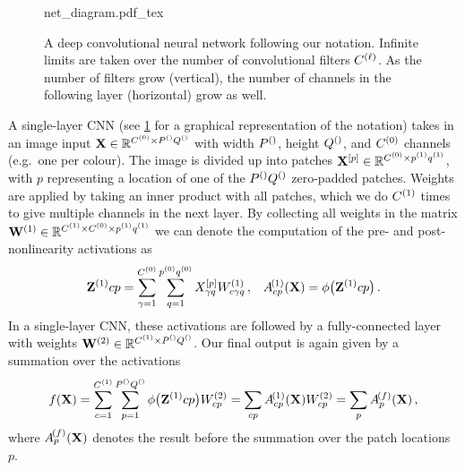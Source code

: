 \documentclass[tablecaption=bottom,wcp,nonatbib]{jmlr} %
\newcommand{\vX}{\mathbf{X}}
\newcommand{\vZ}{\mathbf{Z}}
\begin{document}
\begin{figure}[b]
  \centering
{\renewcommand{\layerAs}[1]{\vZ^{(#1)}}
  {net_diagram.pdf_tex}}
  \caption{A deep convolutional neural network following our notation. Infinite limits are taken over the number of convolutional filters $C^{(\ell)}$. As the number of filters grow (vertical), the number of channels in the following layer (horizontal) grow as well.}
  \label{fig:fancy-cnn}
\end{figure}

\newcommand{\convpatch}[2]{{#1}^{[#2]}}
A single-layer CNN (see \cref{fig:fancy-cnn} for a graphical representation of the notation) takes in an image input $\vX \in \Reals^{\layerC{0}\times \layersize{}}$ with width $P^{()}$, height $Q^{()}$, and $C^{(0)}$ channels (e.g.~one per colour). The image is divided up into patches $\convpatch{\vX}{p} \in \Reals^{\layerC{0}\times\patchw{1}\patchh{1}}$, with $p$ representing a location of one of the $P^{()}Q^{()}$ zero-padded patches. Weights are applied by taking an inner product with all patches, which we do $C^{(1)}$ times to give multiple channels in the next layer. By collecting all weights in the matrix $\mathbf{W}^{(1)}\in\mathbb{R}^{C^{(1)}\times C^{(0)}\times p^{(1)}q^{(1)}}$ we can denote the computation of the pre- and post-nonlinearity activations as
\begin{align}
    \layerAs{1}{cp} = \sum_{\gamma=1}^{\layerC0}\sum_{q=1}^{\patchw0\patchh0} \convpatch{X}{p}_{\gamma q} \layerWs1_{c\gamma q} \,, && \layerNLAs{(1)}{cp} = \phi\big(\layerAs{1}{cp}\big)\,.
\end{align}
In a single-layer CNN, these activations are followed by a fully-connected layer with weights $\mathbf{W}^{(2)} \in \mathbb{R}^{C^{(1)}\times P^{()}Q^{()}}$. Our final output is again given by a summation over the activations
\begin{align}
    f(\vX) = \sum_{c=1}^{\layerC1}\sum_{p=1}^{\layersize{}} \phi\big(\layerAs{1}{cp}\big) W^{(2)}_{cp} = \sum_{cp} \layerNLAs{(1)}{cp}\layerWs{2}_{cp} = \sum_p \layerNLAs{(f)}{p} \label{eq:single-layer-f} \,,
\end{align}
where $\layerNLAs{(f)}{p}$ denotes the result before the summation over the patch locations $p$. 
\end{document}
